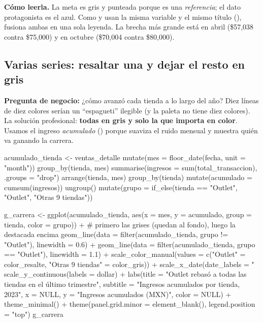 \textbf{Cómo leerla.} La meta es gris y punteada porque es una
\emph{referencia}; el dato protagonista es el azul. Como  y
 usan la misma variable y el mismo título (),
 fusiona ambas en una sola leyenda. La brecha más grande
está en abril (\$57,038 contra \$75,000) y en octubre (\$70,004 contra
\$80,000).

\subsection{Varias series: resaltar una y dejar el resto en gris}

\textbf{Pregunta de negocio:} ¿cómo avanzó cada tienda a lo largo del año?
Diez líneas de diez colores serían un ``espagueti'' ilegible (y la paleta no
tiene diez colores). La solución profesional: \textbf{todas en gris y solo
la que importa en color}. Usamos el ingreso \emph{acumulado}
() porque suaviza el ruido mensual y muestra quién va
ganando la carrera.

\begin{rcode}
acumulado_tienda <- ventas_detalle %
  mutate(mes = floor_date(fecha, unit = "month")) %
  group_by(tienda, mes) %
  summarise(ingresos = sum(total_transaccion), .groups = "drop") %
  arrange(tienda, mes) %
  group_by(tienda) %
  mutate(acumulado = cumsum(ingresos)) %
  ungroup() %
  mutate(grupo = if_else(tienda == "Outlet", "Outlet",
                         "Otras 9 tiendas"))

g_carrera <- ggplot(acumulado_tienda,
                    aes(x = mes, y = acumulado,
                        group = tienda, color = grupo)) +
  # primero las grises (quedan al fondo), luego la destacada encima
  geom_line(data = filter(acumulado_tienda, grupo != "Outlet"),
            linewidth = 0.6) +
  geom_line(data = filter(acumulado_tienda, grupo == "Outlet"),
            linewidth = 1.1) +
  scale_color_manual(values = c("Outlet" = color_resalte,
                                "Otras 9 tiendas" = color_gris)) +
  scale_x_date(date_labels = "%
  scale_y_continuous(labels = dollar) +
  labs(title = "Outlet rebasó a todas las tiendas en el último trimestre",
       subtitle = "Ingresos acumulados por tienda, 2023",
       x = NULL, y = "Ingresos acumulados (MXN)", color = NULL) +
  theme_minimal() +
  theme(panel.grid.minor = element_blank(),
        legend.position = "top")
g_carrera
\end{rcode}

